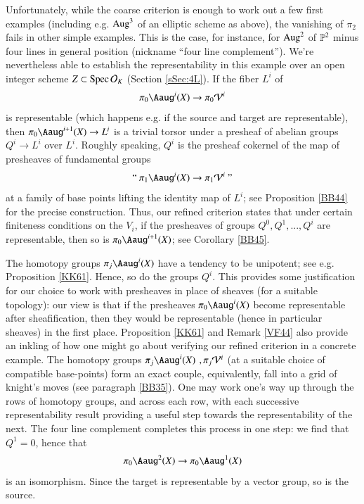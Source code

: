 Unfortunately, while the coarse criterion is enough to work out a few first examples (including e.g. $\operatorname{Aug}^3$ of an elliptic scheme as above), the vanishing of $\pi_2$ fails in other simple examples. This is the case, for instance, for $\operatorname{Aug}^2$ of $\mathbb{P}^2$ minus four lines in general position (nickname ``four line complement''). We're nevertheless able to establish the representability in this example over an open integer scheme $Z \subset \operatorname{Spec} \mathcal{O}_K$ (Section \ref{sSec:4L}). If the fiber $L^i$ of 
\[
\pi_0\Aaug^i(X) \to \pi_0 \Vv^i
\]
is representable (which happens e.g. if the source and target are representable), then $\pi_0 \Aaug^{i+1}(X) \to L^i$ is a trivial torsor under a presheaf of abelian groups $Q^i \to L^i$ over $L^i$. Roughly speaking, $Q^i$ is the presheaf cokernel of the map of presheaves of fundamental groups 
\[
\text{`` }\pi_1\Aaug^i(X) \to \pi_1 \Vv^i\text{ ''}
\]
at a family of base points lifting the identity map of $L^i$; see Proposition \ref{BB44} for the precise construction. Thus, our refined criterion states that under certain finiteness conditions on the $V_i$, if the presheaves of groups $Q^0, Q^1, ..., Q^i$ are representable, then so is $\pi_0\Aaug^{i+1}(X)$; see Corollary \ref{BB45}. 

The homotopy groups $\pi_j \Aaug^i(X)$ have a tendency to be unipotent; see e.g. Proposition \ref{KK61}. Hence, so do the groups $Q^i$. This provides some justification for our choice to work with presheaves in place of sheaves (for a suitable topology): our view is that if the presheaves $\pi_0 \Aaug^i(X)$ become representable after sheafification, then they would be representable (hence in particular sheaves) in the first place. Proposition \ref{KK61} and Remark \ref{VF44} also provide an inkling of how one might go about verifying our refined criterion in a concrete example. The homotopy groups $\pi_j\Aaug^i(X)$ $, \pi_j \mathcal{V}^i$ (at a suitable choice of compatible base-points) form an exact couple, equivalently, fall into a grid of knight's moves (see paragraph \ref{BB35}). One may work one's way up through the rows of homotopy groups, and across each row, with each successive representability result providing a useful step towards the representability of the next. The four line complement completes this process in one step: we find that $Q^1 = 0$, hence that
\[
\pi_0\Aaug^2(X) \to \pi_0\Aaug^1(X)
\]
is an isomorphism. Since the target is representable by a vector group, so is the source. 

